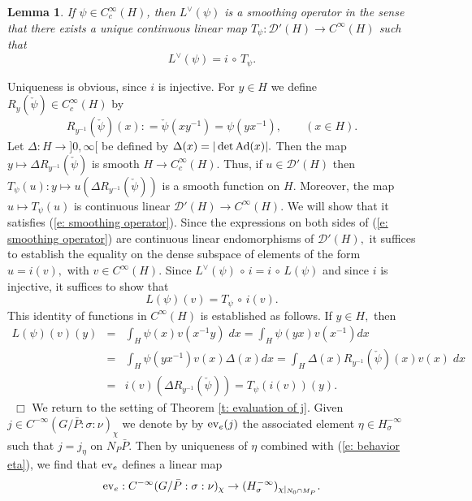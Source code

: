 \documentclass[12pt,a4paper]{article}
\newtheorem{Lemma}[Thm]{Lemma}
\newenvironment{lemma}[0]{\begin{Lemma}\noindent}%
{\end{Lemma}}
\def\proof{\par\noindent{\it Proof.}{\ }{\ }}
\def\qed{~\hfill\hbox{$\Box$}\medbreak}
\def\qquad{\quad\quad}
\def\gs{\sigma}
\def\gD{\Delta}
\def\to{\rightarrow}
\def\Ad{{\rm Ad}}
\def\after{\,{\scriptstyle\circ}\,}
\def\cD{{\mathcal D}}
\numberwithin{Thm}{section}
\numberwithin{equation}{section}
\def\ev{{\rm ev}}
\numberwithin{equation}{section}
\def\cchi{\chi}
\def\veec{\vee}%
\begin{document}
\begin{lemma}
\label{l: smoothing operator}
 If $\psi \in C_c^\infty(H)$, then $L^\veec(\psi)$ is a smoothing 
operator in the sense that there exists a unique continuous
linear map $T_\psi: \cD'(H) \to C^\infty(H)$ such that
\begin{equation} 
\label{e: smoothing operator}
L^\veec(\psi) = i \after T_\psi.
\end{equation} 
\end{lemma}
 
\proof 
Uniqueness is obvious, since $i$ is injective. For $y \in H$ we define $R_y (\check\psi) \in C_c^\infty(H)$ 
by 
$$
R_{y^{-1}} (\check \psi)(x)  : = \check\psi(xy^{-1}) = \psi(yx^{-1}), \qquad (x \in H).
$$%
Let $\gD: H \to ]0,\infty[$ be defined by $\gD(x) = |\det \Ad(x)|.$ Then the map 
$y  \mapsto \gD R_{y^{-1}}(\check\psi) $  is smooth $H \to C_c^\infty(H).$ 
Thus, if $u \in \cD'(H)$ then  $T_\psi (u): y\mapsto u(\gD R_{y^{-1}}(\check \psi))$ is a smooth function on $H.$ Moreover, the map $u \mapsto T_\psi(u)$ is continuous linear $\cD'(H) \to C^\infty(H).$ 
We will show that it satisfies (\ref{e: smoothing operator}). Since the expressions
on both sides of (\ref{e: smoothing operator}) are continuous linear endomorphisms of $\cD'(H),$ 
it suffices to establish the equality on the dense subspace of elements of the form $u = i(v),$ with $v \in C^\infty(H).$ 
Since $L^\veec(\psi  ) \after i = i \after L(\psi)$ and since $i$ is injective, it suffices to show that
$$ 
L(\psi)(v)  = T_\psi \after i(v).
$$%
This identity of functions in $C^\infty(H)$ is established as follows. If $y \in H,$ then 
\begin{eqnarray*}
L(\psi)(v)(y) & = & \int_H \psi (x) v(x^{-1} y) \; dx  =   \int_H \psi(yx)  v(x^{-1})   dx\\
&=&  \int_H \psi(yx^{-1})  v(x)  \gD(x)  dx =   \int_H \gD(x) R_{y^{-1}}(\check \psi)(x) v(x) \; dx \\
 & = & i(v)(\gD R_{y^{-1}}(\check \psi)) = T_\psi(i(v))(y). 
\end{eqnarray*}
\qed
%
We return to the setting of Theorem \ref{t: evaluation of j}.
Given $j \in C^{-\infty}(G/\bar P:\gs: \nu)_\cchi $ we denote by by $\ev_e(j)$ the associated
element $\eta \in H_\gs^{-\infty}$ such that $j = j_\eta$ on $N_P\bar P.$ 
Then by uniqueness of $\eta$ combined with (\ref{e: behavior eta}),
we find that $\ev_e$ defines a linear map
\begin{equation}
\label{e: defi ev e}
\ev_e: C^{-\infty}(G/\bar P:\gs:  \nu)_\cchi \to (H_\gs^{-\infty})_{\cchi|_{N_0\cap M_P}}.
\end{equation}
\end{document}
